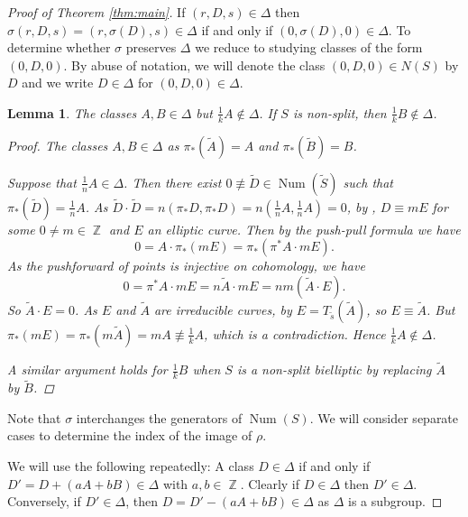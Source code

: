 \documentclass[a4paper, 12pt, twoside]{amsart}
\theoremstyle{plain}
\newtheorem{lemma}[theorem]{Lemma}
\theoremstyle{definition}
\DeclareMathOperator{\num}{Num}
\DeclareMathOperator{\Z}{\mathbb{Z}}
\begin{document}
\begin{proof}[Proof of Theorem \ref{thm:main}]
If $(r,D,s) \in \Delta$ then
$\sigma(r,D,s)= (r,\sigma(D),s) \in \Delta$ if and only if
$(0,\sigma(D),0) \in \Delta$. To determine whether $\sigma$ preserves
$\Delta$ we reduce to studying classes of the form $(0,D,0)$. By abuse
of notation, we will denote the class $(0,D,0) \in N(S)$ by $D$ and we
write $D \in \Delta$ for $(0,D,0) \in \Delta$.

\begin{lemma}\label{lem:classes_in_Delta}
  The classes $A,B \in \Delta$ but $\frac{1}{k}A \notin \Delta$. If
  $S$ is non-split, then $\frac{1}{k}B \notin \Delta$.
\begin{proof}
  The classes $A, B \in \Delta$ as $\pi_*(\tilde{A}) = A$ and
  $\pi_*(\tilde{B}) = B$.

  Suppose that $\frac{1}{n}A \in \Delta$. Then there exist
  $0 \not\equiv \widetilde{D} \in \num(\widetilde{S})$ such that
  $\pi_*(\widetilde{D}) = \frac{1}{n}A$. As
  $\widetilde{D} \cdot \widetilde{D} = n(\pi_*D,\pi_*D) =
  n(\frac{1}{n}A,\frac{1}{n}A) = 0$, by \cite[Proposition
  2.3]{MR1285957}, $D \equiv mE$ for some $0 \ne m \in \Z$ and $E$ an
  elliptic curve. Then by the push-pull formula we have
  \[
    0 = A \cdot \pi_*(mE) = \pi_*(\pi^*A \cdot mE).
  \]
  As the pushforward of points is injective on cohomology, we have
  \[
    0 = \pi^*A \cdot mE = n\widetilde{A} \cdot mE = nm (\widetilde{A} \cdot E).
  \]
  So $\widetilde{A} \cdot E = 0$. As $E$ and $\widetilde{A}$ are
  irreducible curves, by \cite[Proposition 2.1]{MR1285957}
  $E =T_{\tilde{s}}(\widetilde{A})$, so $E \equiv \widetilde{A}$. But
  $\pi_*(mE) = \pi_*(m\widetilde{A}) = mA \not\equiv \frac{1}{k}A$,
  which is a contradiction. Hence $\frac{1}{k}A \notin \Delta$.

  A similar argument holds for $\frac{1}{k}B$ when $S$ is a non-split
  bielliptic by replacing $\widetilde{A}$ by $\widetilde{B}$.
\end{proof}
\end{lemma}

Note that $\sigma$ interchanges the generators of $\num(S)$. We will
consider separate cases to determine the index of the image of $\rho$.

We will use the following repeatedly: A class $D \in \Delta$ if
and only if $D' = D + (aA + bB) \in \Delta$ with $a,b \in \Z$. Clearly
if $D \in \Delta$ then $D' \in \Delta$. Conversely, if
$D' \in \Delta$, then $D = D' - (aA +bB) \in \Delta$ as $\Delta$ is a
subgroup.


\end{proof}
\end{document}
